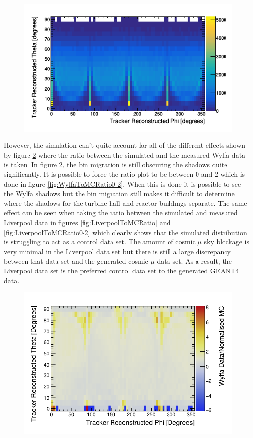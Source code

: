 \begin{figure}[!h]
 \centering
 \includegraphics[width=0.7\linewidth]{Chapter5/Figs/UsingSimulatedDataAsControl/mc_PvsT.png}
 \label{fig:mc_PvsT}
\end{figure}

However, the simulation can't quite account for all of the different effects shown by figure \ref{fig:WylfaToMCRatio} where the ratio between the simulated and the measured Wylfa data is taken. In figure \ref{fig:WylfaToMCRatio}, the bin migration is still obscuring the shadows quite significantly. It is possible to force the ratio plot to be between 0 and 2 which is done in figure \ref{fig:WylfaToMCRatio0-2}. When this is done it is possible to see the Wylfa shadows but the bin migration still makes it difficult to determine where the shadows for the turbine hall and reactor buildings separate. The same effect can be seen when taking the ratio between the simulated and measured Liverpool data in figures \ref{fig:LiverpoolToMCRatio} and \ref{fig:LiverpoolToMCRatio0-2} which clearly shows that the simulated distribution is struggling to act as a control data set. The amount of cosmic $\mu$ sky blockage is very minimal in the Liverpool data set but there is still a large discrepancy between that data set and the generated cosmic $\mu$ data set. As a result, the Liverpool data set is the preferred control data set to the generated GEANT4 data. 

\begin{figure}[!h]
 \centering
 \includegraphics[width=0.7\linewidth]{Chapter5/Figs/UsingSimulatedDataAsControl/WylfaToMCRatio.png}
 \label{fig:WylfaToMCRatio}
\end{figure}

